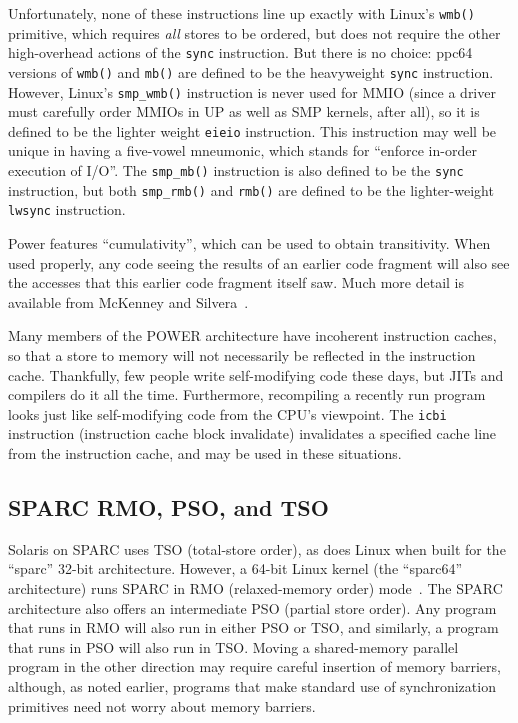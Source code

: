 Unfortunately, none of these instructions line up exactly with Linux's
{\tt wmb()} primitive, which requires {\em all} stores to be ordered,
but does not require the other high-overhead actions of the {\tt sync}
instruction.
But there is no choice: ppc64 versions of {\tt wmb()} and {\tt mb()} are
defined to be the heavyweight {\tt sync} instruction.
However, Linux's {\tt smp\_wmb()} instruction is never used for MMIO
(since a driver must carefully order MMIOs in UP as well as
SMP kernels, after all), so it is defined to be the lighter weight
{\tt eieio} instruction.
This instruction may well be unique in having a five-vowel mneumonic,
which stands for ``enforce in-order execution of I/O''.
The {\tt smp\_mb()} instruction is also defined to be the {\tt sync}
instruction, but both {\tt smp\_rmb()} and {\tt rmb()} are defined to
be the lighter-weight {\tt lwsync} instruction.

Power features ``cumulativity'', which can be used to obtain
transitivity.
When used properly, any code seeing the results of an earlier
code fragment will also see the accesses that this earlier code
fragment itself saw.
Much more detail is available from
McKenney and Silvera~\cite{PaulEMcKenneyN2745r2009}.

Many members of the POWER architecture have incoherent instruction
caches, so that a store to memory will not necessarily be reflected
in the instruction cache.
Thankfully, few people write self-modifying code these days, but JITs
and compilers do it all the time.
Furthermore, recompiling a recently run program looks just like
self-modifying code from the CPU's viewpoint.
The {\tt icbi} instruction (instruction cache block invalidate)
invalidates a specified cache line from
the instruction cache, and may be used in these situations.

\subsection{SPARC RMO, PSO, and TSO}

Solaris on SPARC uses TSO (total-store order), as does Linux when built for
the ``sparc'' 32-bit architecture.
However, a 64-bit Linux kernel (the ``sparc64'' architecture)
runs SPARC in RMO (relaxed-memory order) mode~\cite{SPARC94}.
The SPARC architecture also offers an intermediate PSO (partial store
order).
Any program that runs in RMO will also run in either PSO or TSO, and similarly,
a program that runs in PSO will also run in TSO.
Moving a shared-memory parallel program in the other direction may
require careful insertion of memory barriers, although, as noted earlier,
programs that make standard use of synchronization primitives need not
worry about memory barriers.

